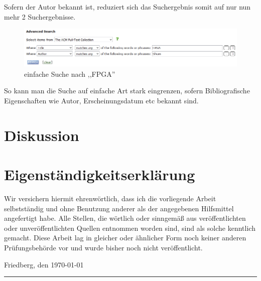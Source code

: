 \documentclass[
	ngerman,
	parskip=half,
	headsepline,
	fontsize=12pt,
	DIV=13,
	listof=leveldown,
	]{scrreprt}
\begin{document}
Sofern der Autor bekannt ist, reduziert sich das Suchergebnis somit auf nur nun mehr 2 Suchergebnisse.
\begin{figure}[ht]
\centering
\includegraphics[width=\textwidth]{img/Suche_FPGA-Shum.PNG}
\caption{einfache Suche nach ,,FPGA''}
\end{figure}
So kann man die Suche auf einfache Art stark eingrenzen, sofern Bibliografische Eigenschaften wie Autor, Erscheinungsdatum etc bekannt sind.
	
	\chapter{Diskussion}	
	
	\chapter{Eigenständigkeitserklärung}
	
	Wir versichern hiermit ehrenwörtlich, dass ich die vorliegende Arbeit selbstständig und ohne Benutzung anderer als der angegebenen Hilfsmittel angefertigt habe. Alle Stellen, die wörtlich oder sinngemäß aus veröffentlichten oder unveröffentlichten Quellen entnommen worden sind, sind als solche kenntlich gemacht. Diese Arbeit lag in gleicher oder ähnlicher Form noch keiner anderen Prüfungsbehörde vor und wurde bisher noch nicht veröffentlicht.
	
	Friedberg, den \today
	
	
	\rule[-0.2cm]{5cm}{0.5pt}
	
	\textsc{\theauthor} 

	
	
	
	\printbibliography
\end{document}
